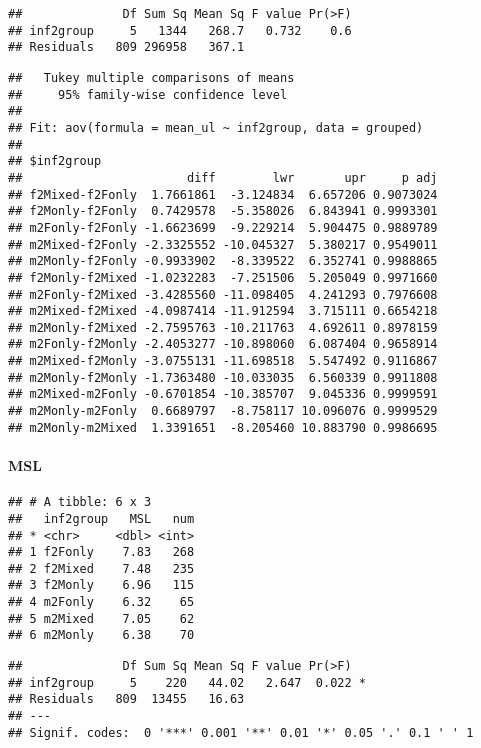 \documentclass[
]{article}
\begin{document}
\begin{verbatim}
##              Df Sum Sq Mean Sq F value Pr(>F)
## inf2group     5   1344   268.7   0.732    0.6
## Residuals   809 296958   367.1
\end{verbatim}

\begin{verbatim}
##   Tukey multiple comparisons of means
##     95% family-wise confidence level
## 
## Fit: aov(formula = mean_ul ~ inf2group, data = grouped)
## 
## $inf2group
##                       diff        lwr       upr     p adj
## f2Mixed-f2Fonly  1.7661861  -3.124834  6.657206 0.9073024
## f2Monly-f2Fonly  0.7429578  -5.358026  6.843941 0.9993301
## m2Fonly-f2Fonly -1.6623699  -9.229214  5.904475 0.9889789
## m2Mixed-f2Fonly -2.3325552 -10.045327  5.380217 0.9549011
## m2Monly-f2Fonly -0.9933902  -8.339522  6.352741 0.9988865
## f2Monly-f2Mixed -1.0232283  -7.251506  5.205049 0.9971660
## m2Fonly-f2Mixed -3.4285560 -11.098405  4.241293 0.7976608
## m2Mixed-f2Mixed -4.0987414 -11.912594  3.715111 0.6654218
## m2Monly-f2Mixed -2.7595763 -10.211763  4.692611 0.8978159
## m2Fonly-f2Monly -2.4053277 -10.898060  6.087404 0.9658914
## m2Mixed-f2Monly -3.0755131 -11.698518  5.547492 0.9116867
## m2Monly-f2Monly -1.7363480 -10.033035  6.560339 0.9911808
## m2Mixed-m2Fonly -0.6701854 -10.385707  9.045336 0.9999591
## m2Monly-m2Fonly  0.6689797  -8.758117 10.096076 0.9999529
## m2Monly-m2Mixed  1.3391651  -8.205460 10.883790 0.9986695
\end{verbatim}

\hypertarget{msl-4}{%
\paragraph{MSL}\label{msl-4}}

\begin{verbatim}
## # A tibble: 6 x 3
##   inf2group   MSL   num
## * <chr>     <dbl> <int>
## 1 f2Fonly    7.83   268
## 2 f2Mixed    7.48   235
## 3 f2Monly    6.96   115
## 4 m2Fonly    6.32    65
## 5 m2Mixed    7.05    62
## 6 m2Monly    6.38    70
\end{verbatim}

\begin{verbatim}
##              Df Sum Sq Mean Sq F value Pr(>F)  
## inf2group     5    220   44.02   2.647  0.022 *
## Residuals   809  13455   16.63                 
## ---
## Signif. codes:  0 '***' 0.001 '**' 0.01 '*' 0.05 '.' 0.1 ' ' 1
\end{verbatim}
\end{document}
